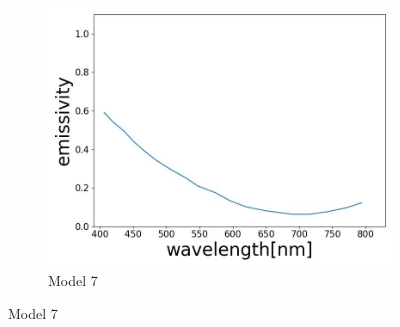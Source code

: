 \begin{figure}[htbp]
\begin{subfigure}{0.3\linewidth}
      \includegraphics[width=\linewidth]{figures/emissivity_31.jpg}
      \caption{Model 7}
      \label{fig: emi_31}
    \end{subfigure}
    
    \medskip
    

\end{figure}
